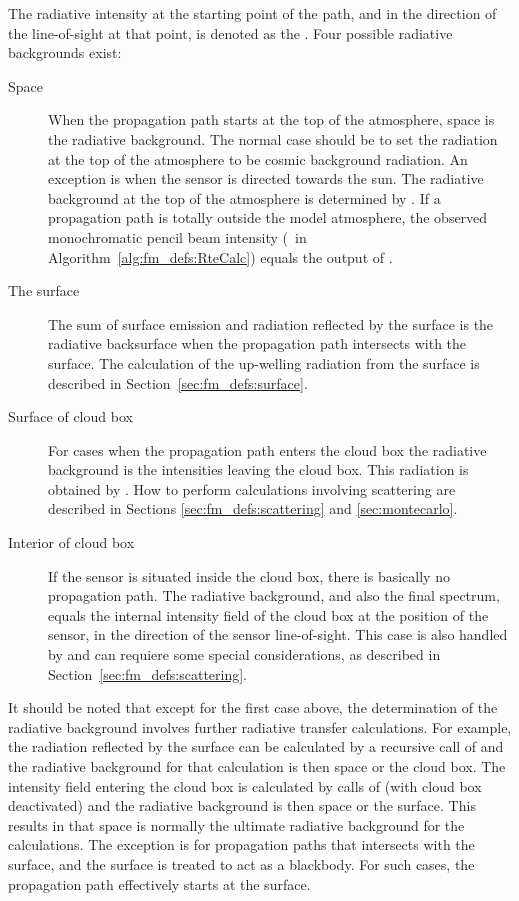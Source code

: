 The radiative intensity at the starting point of the path, and in the
direction of the line-of-sight at that point, is denoted as the
. Four possible radiative backgrounds
exist:
\begin{description}
\item[Space] When the propagation path starts at the top of the
  atmosphere, space is the radiative background. The normal case
  should be to set the radiation at the top of the atmosphere to be
  cosmic background radiation. An exception is when the sensor is
  directed towards the sun. The radiative background at the top of the
  atmosphere is determined by . If a
  propagation path is totally outside the model atmosphere, the
  observed monochromatic pencil beam intensity (\ in
  Algorithm~\ref{alg:fm_defs:RteCalc}) equals the output of
  .
\item[The surface] The sum of surface emission and radiation reflected
  by the surface is the radiative backsurface when the propagation path
  intersects with the surface. The calculation of the up-welling
  radiation from the surface is described in
  Section~\ref{sec:fm_defs:surface}.
\item[Surface of cloud box] For cases when the propagation path enters
  the cloud box the radiative background is the intensities leaving
  the cloud box. This radiation is obtained by
  . How to perform calculations
  involving scattering are described in
  Sections \ref{sec:fm_defs:scattering} and \ref{sec:montecarlo}.
\item[Interior of cloud box] If the sensor is situated inside the
  cloud box, there is basically no propagation path. The radiative
  background, and also the final spectrum, equals the internal
  intensity field of the cloud box at the position of the sensor, in
  the direction of the sensor line-of-sight. This case is also handled
  by  and can requiere some special
  considerations, as described in
  Section~\ref{sec:fm_defs:scattering}.
\end{description}
It should be noted that except for the first case above, the
determination of the radiative background involves further radiative
transfer calculations. For example, the radiation reflected by the
surface can be calculated by a recursive call of 
and the radiative background for that calculation is then space or the
cloud box. The intensity field entering the cloud box is calculated by
calls of  (with cloud box deactivated) and the
radiative background is then space or the surface. This results in that
space is normally the ultimate radiative background for the
calculations. The exception is for propagation paths that intersects
with the surface, and the surface is treated to act as a blackbody. For
such cases, the propagation path effectively starts at the surface.


